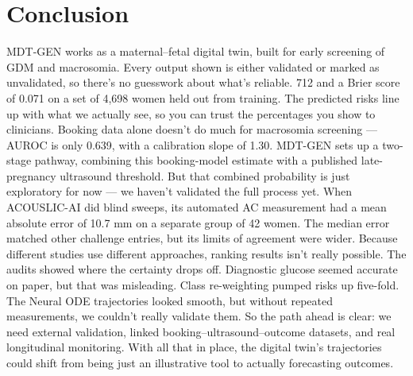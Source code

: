 \documentclass[conference]{IEEEtran}
\begin{document}
\section{Conclusion}

MDT-GEN works as a maternal--fetal digital twin, built for early screening of GDM and macrosomia. Every output shown is either validated or marked as unvalidated, so there's no guesswork about what's reliable. 712 and a Brier score of 0.071 on a set of 4,698 women held out from training. The predicted risks line up with what we actually see, so you can trust the percentages you show to clinicians. Booking data alone doesn't do much for macrosomia screening --- AUROC is only 0.639, with a calibration slope of 1.30. MDT-GEN sets up a two-stage pathway, combining this booking-model estimate with a published late-pregnancy ultrasound threshold. But that combined probability is just exploratory for now --- we haven't validated the full process yet. When ACOUSLIC-AI did blind sweeps, its automated AC measurement had a mean absolute error of 10.7 mm on a separate group of 42 women. The median error matched other challenge entries, but its limits of agreement were wider. Because different studies use different approaches, ranking results isn't really possible. The audits showed where the certainty drops off. Diagnostic glucose seemed accurate on paper, but that was misleading. Class re-weighting pumped risks up five-fold. The Neural ODE trajectories looked smooth, but without repeated measurements, we couldn't really validate them. So the path ahead is clear: we need external validation, linked booking--ultrasound--outcome datasets, and real longitudinal monitoring. With all that in place, the digital twin's trajectories could shift from being just an illustrative tool to actually forecasting outcomes.
\end{document}
